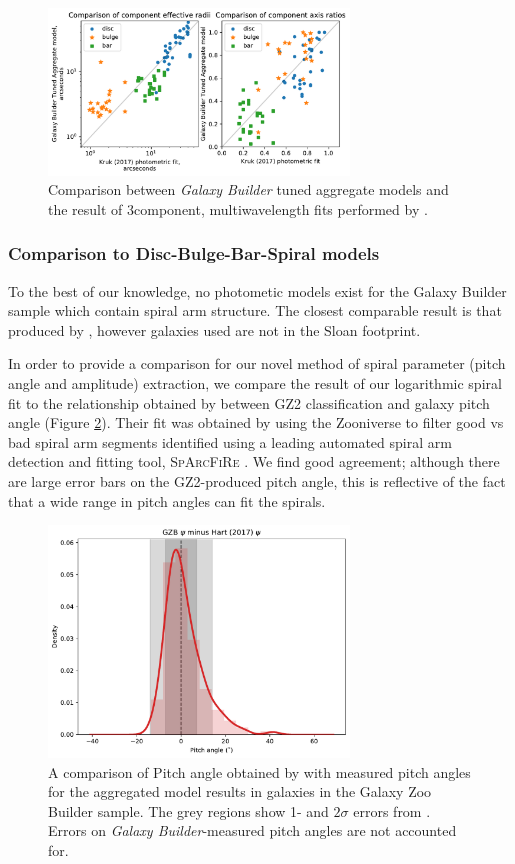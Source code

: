 \documentclass[../main.tex]{subfiles}
\begin{document}
\begin{figure}
  \includegraphics[width=8cm]{images__results/sd_comp_comparison.pdf}
  \caption{Comparison between \textit{Galaxy Builder} tuned aggregate models and the result of 3\-component, multi\-wavelength fits performed by \citet{Kruk2017:1710.00093v2}.}
  \label{fig:sd_comp_comparison}
\end{figure}


\subsubsection{Comparison to Disc-Bulge-Bar-Spiral models}
To the best of our knowledge, no photometic models exist for the Galaxy Builder sample which contain spiral arm structure. The closest comparable result is that produced by \citet{Gao2017:1709.00746v1}, however galaxies used are not in the Sloan footprint.

In order to provide a comparison for our novel method of spiral parameter (pitch angle and amplitude) extraction, we compare the result of our logarithmic spiral fit to the relationship obtained by \citet{Hart2016:1607.01019v1} between GZ2 classification and galaxy pitch angle (Figure \ref{fig:hart_pitch_angle}). Their fit was obtained by using the Zooniverse to filter good vs bad spiral arm segments identified using a leading automated spiral arm detection and fitting tool, \textsc{SpArcFiRe} \citep{Davis2014:1402.1910v1}. We find good agreement; although there are large error bars on the GZ2-produced pitch angle, this is reflective of the fact that a wide range in pitch angles can fit the spirals.

\begin{figure}
  \includegraphics[width=8cm]{images__results/gzb-hart-comparison.pdf}
  \caption{A comparison of Pitch angle obtained by \citet{Hart2016:1607.01019v1} with measured pitch angles for the aggregated model results in galaxies in the Galaxy Zoo Builder sample. The grey regions show 1- and $2\sigma$ errors from \citet{Hart2016:1607.01019v1}. Errors on \textit{Galaxy Builder}-measured pitch angles are not accounted for.}
  \label{fig:hart_pitch_angle}
\end{figure}
\end{document}

